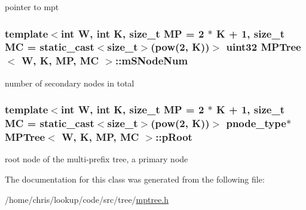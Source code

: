 pointer to mpt 

\hypertarget{classMPTree_a69977970b2e2ae088e5973847071005b}{
\subsubsection[{m\-S\-Node\-Num}]{\setlength{\rightskip}{0pt plus 5cm}template$<$int W, int K, size\-\_\-t M\-P = 2 $\ast$ K + 1, size\-\_\-t M\-C = static\-\_\-cast$<$size\-\_\-t$>$(pow(2, K))$>$ {\bf uint32} {\bf M\-P\-Tree}$<$ {\bf W}, K, M\-P, M\-C $>$\-::m\-S\-Node\-Num\hspace{0.3cm}{\ttfamily [private]}}}\label{classMPTree_a69977970b2e2ae088e5973847071005b}


number of secondary nodes in total 

\hypertarget{classMPTree_a63dc440043e3e752fadf7a6c86f5a66f}{
\subsubsection[{p\-Root}]{\setlength{\rightskip}{0pt plus 5cm}template$<$int W, int K, size\-\_\-t M\-P = 2 $\ast$ K + 1, size\-\_\-t M\-C = static\-\_\-cast$<$size\-\_\-t$>$(pow(2, K))$>$ {\bf pnode\-\_\-type}$\ast$ {\bf M\-P\-Tree}$<$ {\bf W}, K, M\-P, M\-C $>$\-::p\-Root\hspace{0.3cm}{\ttfamily [private]}}}\label{classMPTree_a63dc440043e3e752fadf7a6c86f5a66f}


root node of the multi-\/prefix tree, a primary node 



The documentation for this class was generated from the following file\-:\begin{DoxyCompactItemize}
\item 
/home/chris/lookup/code/src/tree/\hyperlink{mptree_8h}{mptree.\-h}\end{DoxyCompactItemize}

